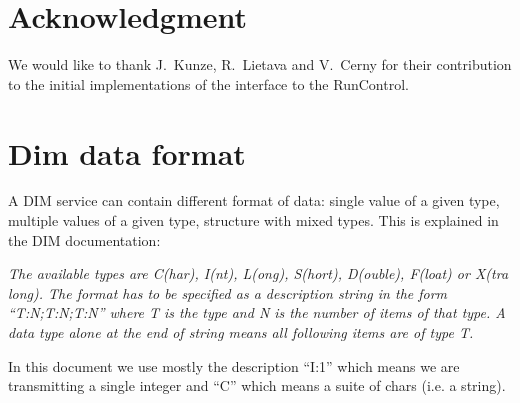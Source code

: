 \documentclass[a4paper]{article}
\begin{document}
\section{Acknowledgment}
We would like to thank J.~Kunze, R.~Lietava and V.~Cerny for their contribution to the initial
implementations of the interface to the RunControl.

\appendix
\appendixpage
\section{Dim data format}\label{app:dimFormat}
%
A DIM service can contain different format of data: single value of a given
type, multiple values of a given type, structure with mixed types. This is
explained in the DIM documentation\cite{biblio:DIM}:

\textit{The available types are C(har), I(nt), L(ong), S(hort), D(ouble),
F(loat) or X(tra long). The format has to be specified as a description string in the form
``T:N;T:N;T:N'' where T is the type and N is the number of items of that type.
A data type alone at the end of string means all following items are of type T.}

In this document we use mostly the description ``I:1'' which means we are
transmitting a single integer and ``C'' which means a suite of chars (i.e. a
string).

\thebibliography{}

\end{document}
